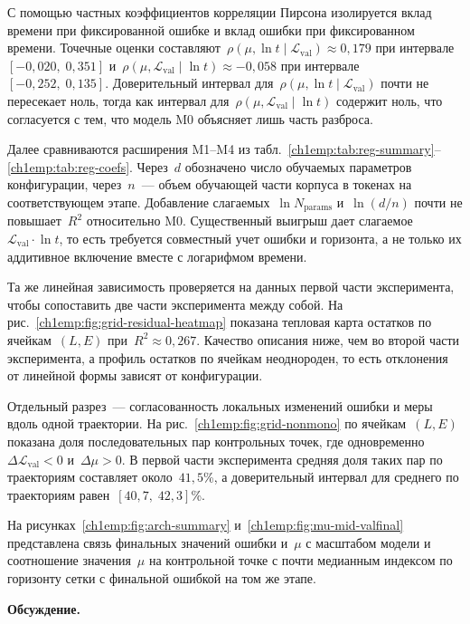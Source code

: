 С помощью частных коэффициентов корреляции Пирсона изолируется вклад времени при фиксированной ошибке и вклад ошибки при фиксированном времени.
Точечные оценки составляют~$\rho(\mu,\ln t\mid\mathcal{L}_{\mathrm{val}})\approx 0{,}179$ при интервале~$[-0{,}020,\;0{,}351]$ и~$\rho(\mu,\mathcal{L}_{\mathrm{val}}\mid\ln t)\approx -0{,}058$ при интервале~$[-0{,}252,\;0{,}135]$.
Доверительный интервал для~$\rho(\mu,\ln t\mid\mathcal{L}_{\mathrm{val}})$ почти не пересекает ноль, тогда как интервал для~$\rho(\mu,\mathcal{L}_{\mathrm{val}}\mid\ln t)$ содержит ноль, что согласуется с тем, что модель M0 объясняет лишь часть разброса.

Далее сравниваются расширения M1--M4 из табл.~\ref{ch1emp:tab:reg-summary}--\ref{ch1emp:tab:reg-coefs}.
Через~$d$ обозначено число обучаемых параметров конфигурации, через~$n$~--- объем обучающей части корпуса в токенах на соответствующем этапе.
Добавление слагаемых~$\ln N_{\mathrm{params}}$ и~$\ln(d/n)$ почти не повышает~$R^2$ относительно M0.
Существенный выигрыш дает слагаемое~$\mathcal{L}_{\mathrm{val}}\cdot\ln t$, то есть требуется совместный учет ошибки и горизонта, а не только их аддитивное включение вместе с логарифмом времени.

Та же линейная зависимость проверяется на данных первой части эксперимента, чтобы сопоставить две части эксперимента между собой.
На рис.~\ref{ch1emp:fig:grid-residual-heatmap} показана тепловая карта остатков по ячейкам~$(L,E)$ при~$R^2\approx 0{,}267$.
Качество описания ниже, чем во второй части эксперимента, а профиль остатков по ячейкам неоднороден, то есть отклонения от линейной формы зависят от конфигурации.

Отдельный разрез~--- согласованность локальных изменений ошибки и меры вдоль одной траектории.
На рис.~\ref{ch1emp:fig:grid-nonmono} по ячейкам~$(L,E)$ показана доля последовательных пар контрольных точек, где одновременно~$\Delta\mathcal{L}_{\mathrm{val}}<0$ и~$\Delta\mu>0$.
В первой части эксперимента средняя доля таких пар по траекториям составляет около~$41{,}5$\%, а доверительный интервал для среднего по траекториям равен~$[40{,}7,\;42{,}3]$\%.

На рисунках~\ref{ch1emp:fig:arch-summary} и~\ref{ch1emp:fig:mu-mid-valfinal} представлена связь финальных значений ошибки и~$\mu$ с масштабом модели и соотношение значения~$\mu$ на контрольной точке с почти медианным индексом по горизонту сетки с финальной ошибкой на том же этапе.

\textbf{Обсуждение.}

